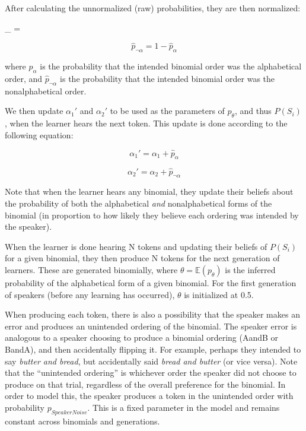 \documentclass[10pt, letterpaper, hidelinks]{article}
\begin{document}
After calculating the unnormalized (raw) probabilities, they are then
normalized:

\begin{myequation}%
\label{eq:phatalpha}
_{\alpha} =  %
\end{myequation}

\begin{equation}
\label{eq:phatnotalpha}
\hat{p}_{\neg\alpha} = 1 - \hat{p}_\alpha
\end{equation}

\noindent where \(\hat{p}_\alpha\) is the probability that the intended
binomial order was the alphabetical order, and \(\hat{p}_{\neg\alpha}\)
is the probability that the intended binomial order was the
nonalphabetical order.

We then update \(\alpha_1'\) and \(\alpha_2'\) to be used as the
parameters of \(p_\theta\), and thus \(P(S_i)\), when the learner hears
the next token. This update is done according to the following equation:

\begin{equation}
\label{eq:alpha1prime}
\alpha_1' = \alpha_1 + \hat{p}_\alpha
\end{equation}

\begin{equation}
\label{eq:alpha2prime}
\alpha_2' = \alpha_2 + \hat{p}_{\neg\alpha}
\end{equation}

Note that when the learner hears any binomial, they update their beliefs
about the probability of both the alphabetical \emph{and}
nonalphabetical forms of the binomial (in proportion to how likely they
believe each ordering was intended by the speaker).

When the learner is done hearing N tokens and updating their beliefs of
\(P(S_i)\) for a given binomial, they then produce N tokens for the next
generation of learners. These are generated binomially, where
\(\theta = \mathbb{E}(p_\theta)\) is the inferred probability of the
alphabetical form of a given binomial. For the first generation of
speakers (before any learning has occurred), \(\theta\) is initialized
at 0.5.

When producing each token, there is also a possibility that the speaker
makes an error and produces an unintended ordering of the binomial. The
speaker error is analogous to a speaker choosing to produce a binomial
ordering (AandB or BandA), and then accidentally flipping it. For
example, perhaps they intended to say \emph{butter and bread}, but
accidentally said \emph{bread and butter} (or vice versa). Note that the
``unintended ordering'' is whichever order the speaker did not choose to
produce on that trial, regardless of the overall preference for the
binomial. In order to model this, the speaker produces a token in the
unintended order with probability \(p_{SpeakerNoise}\). This is a fixed
parameter in the model and remains constant across binomials and
generations.
\end{document}

